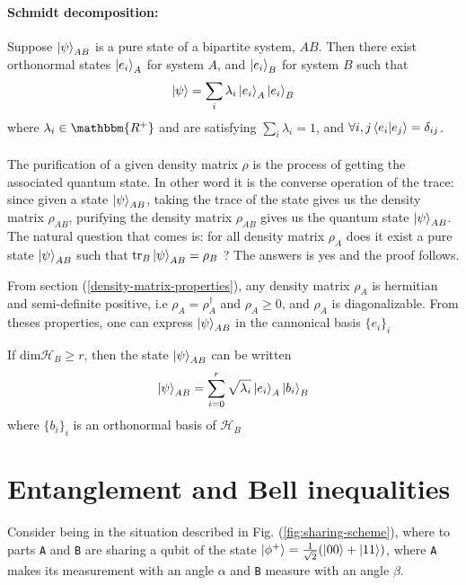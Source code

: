\documentclass{article}
\begin{document}
\paragraph{Schmidt decomposition: }
Suppose $\ket{\psi}_{AB}$ is a pure state of a bipartite system, $AB$. Then
there exist orthonormal states $\ket{e_i}_A$ for system $A$, and $\ket{e_i}_B$
for system $B$ such that
\begin{equation}
    \ket{\psi} = \sum_i\lambda_i \ket{e_i}_A \ket{e_i}_B
\end{equation}
where $\lambda_i \in \mathbbm{R^+}$ and are satisfying $\sum_i\lambda_i=1$, and
$\forall i,j \braket{e_i|e_j}=\delta_{ij}$.
\\ \\
The purification of a given density matrix $\rho$ is the process of getting the
associated quantum state. In other word it is the converse operation of the
trace: since given a state $\ket{\psi}_{AB}$, taking the trace of the state
gives us the density matrix $\rho_{AB}$, purifying the density matrix
$\rho_{AB}$ gives us the quantum state $\ket{\psi}_{AB}$.\\
The natural question that comes is: for all density matrix $\rho_A$ does it
exist a pure state $\ket{\psi}_{AB}$ such that $\text{tr}_B\ket{\psi}_{AB} =
\rho_B$ ? The answers is yes and the proof follows.

From section (\ref{density-matrix-properties}), any density matrix $\rho_A$ is
hermitian and semi-definite positive, i.e $\rho_A=\rho^\dagger_A$ and $\rho_A
\geq 0$, and $\rho_A$ is diagonalizable. From theses properties, one can express
$\ket{\psi}_{AB}$ in the cannonical basis $\{e_i\}_i$

If dim$\mathscr{H}_B \geq r$, then the state $\ket{\psi}_{AB}$
can be written
\begin{equation}
    \ket{\psi}_{AB} = \sum_{i=0}^r \sqrt{\lambda_i} \ket{e_i}_A\ket{b_i}_B
\end{equation}
where $\{b_i\}_i$ is an orthonormal basis of $\mathscr{H}_B$

\section{Entanglement and Bell inequalities}

Consider being in the situation described in Fig. (\ref{fig:sharing-scheme}),
where to parts \texttt{A} and \texttt{B} are sharing a qubit of the state
$\ket{\phi^+}=\frac{1}{\sqrt{2}}(\ket{00} + \ket{11})$, where \texttt{A} makes
its measurement with an angle $\alpha$ and \texttt{B} measure with an angle
$\texttt{$\beta$}$.
\end{document}
